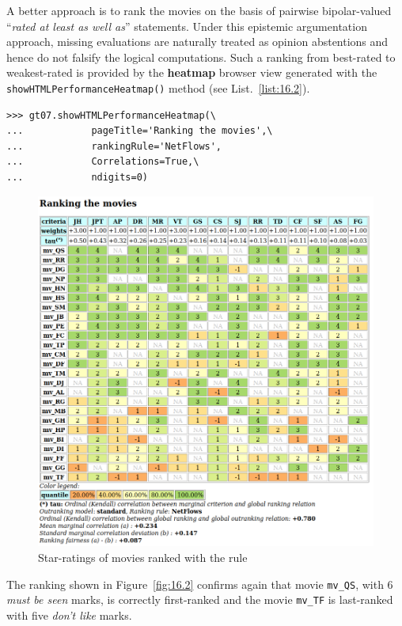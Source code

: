 A better approach is to rank the movies on the basis of pairwise bipolar-valued  ``\emph{rated at least as well as}'' statements. Under this epistemic argumentation approach, missing evaluations are naturally treated as opinion abstentions and hence do not falsify the logical computations. Such a \NetFlows ranking from best-rated to weakest-rated is provided by the \textbf{heatmap} browser view generated with the \texttt{showHTMLPerformanceHeatmap()} method (see List.~\vref{list:16.2}).
\begin{lstlisting}[caption={Showing the movie from best to worst rated in a heatmap view},label=list:16.2]
>>> gt07.showHTMLPerformanceHeatmap(\
...            pageTitle='Ranking the movies',\  
...            rankingRule='NetFlows',
...            Correlations=True,\
...            ndigits=0)
\end{lstlisting}
\begin{figure}[ht]
\includegraphics[width=\hsize]{Figures/16-2-graffiti07_2.png}
\caption{Star-ratings of movies ranked with the \NetFlows rule}
\label{fig:16.2}       %
\end{figure}

The \NetFlows ranking shown in Figure~\vref{fig:16.2} confirms again that movie \texttt{mv\_QS}, with $6$ \emph{must be seen} marks, is correctly first-ranked and the movie \texttt{mv\_TF} is last-ranked with five \emph{don't like} marks. 

